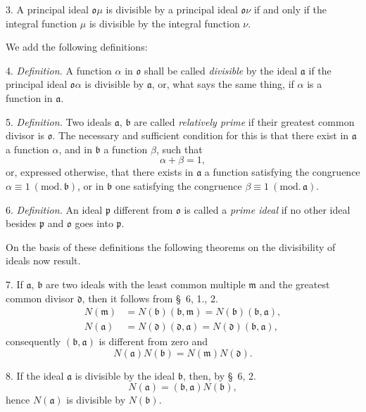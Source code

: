 \documentclass{article}
\begin{document}

3. A principal ideal $\mathfrak{o}\mu$ is divisible by a principal ideal $\mathfrak{o}\nu$ if and only if the integral function $\mu$ is divisible by the integral function $\nu$.

We add the following definitions:

4. \emph{Definition.} A function $\alpha$ in $\mathfrak{o}$ shall be called \emph{divisible} by the ideal $\mathfrak{a}$ if the principal ideal $\mathfrak{o}\alpha$ is divisible by $\mathfrak{a}$, or, what says the same thing, if $\alpha$ is a function in $\mathfrak{a}$.

5. \emph{Definition.} Two ideals $\mathfrak{a}$, $\mathfrak{b}$ are called \emph{relatively prime} if their greatest common divisor is $\mathfrak{o}$. The necessary and sufficient condition for this is that there exist in $\mathfrak{a}$ a function $\alpha$, and in $\mathfrak{b}$ a function $\beta$, such that
\[ \alpha + \beta = 1, \]
or, expressed otherwise, that there exists in $\mathfrak{a}$ a function satisfying the congruence $\alpha \equiv 1 \ (\text{mod.}\,\mathfrak{b})$, or in $\mathfrak{b}$ one satisfying the congruence $\beta \equiv 1 \ (\text{mod.}\,\mathfrak{a})$.

6. \emph{Definition.} An ideal $\mathfrak{p}$ different from $\mathfrak{o}$ is called a \emph{prime ideal} if no other ideal besides $\mathfrak{p}$ and $\mathfrak{o}$ goes into $\mathfrak{p}$.

On the basis of these definitions the following theorems on the divisibility of ideals now result.

7. If $\mathfrak{a}$, $\mathfrak{b}$ are two ideals with the least common multiple $\mathfrak{m}$ and the greatest common divisor $\mathfrak{d}$, then it follows from §~6, 1., 2.
\[ \begin{aligned} N(\mathfrak{m}) &= N(\mathfrak{b})(\mathfrak{b}, \mathfrak{m}) = N(\mathfrak{b})(\mathfrak{b}, \mathfrak{a}), \\ N(\mathfrak{a}) &= N(\mathfrak{d})(\mathfrak{d}, \mathfrak{a}) = N(\mathfrak{d})(\mathfrak{b}, \mathfrak{a}), \end{aligned} \]
consequently $(\mathfrak{b}, \mathfrak{a})$ is different from zero and
\[ N(\mathfrak{a})N(\mathfrak{b}) = N(\mathfrak{m})N(\mathfrak{d}). \]

8. If the ideal $\mathfrak{a}$ is divisible by the ideal $\mathfrak{b}$, then, by §~6, 2.
\[ N(\mathfrak{a}) = (\mathfrak{b}, \mathfrak{a})N(\mathfrak{b}), \]
hence $N(\mathfrak{a})$ is divisible by $N(\mathfrak{b})$.
\end{document}
